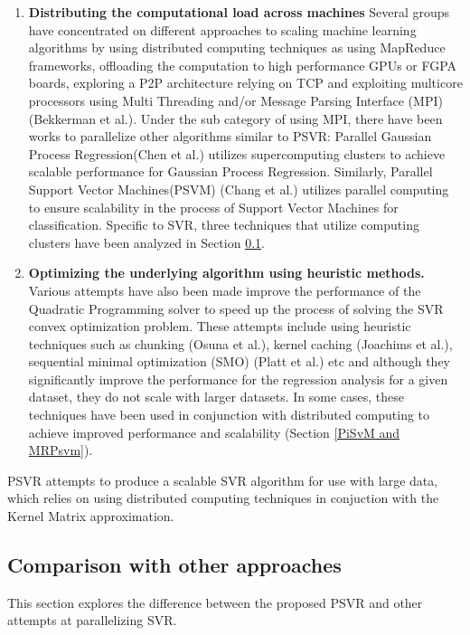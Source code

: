 \documentclass[12pt]{article}
\begin{document}
\begin{enumerate}[label=(\alph*)]
\item {\bf Distributing the computational load across machines}
\newline
Several groups have concentrated on different approaches to scaling machine learning algorithms by using distributed computing techniques as using MapReduce frameworks, offloading the computation to high performance GPUs or FGPA boards, exploring a P2P architecture relying on TCP and exploiting multicore processors using Multi Threading and/or Message Parsing Interface (MPI)(Bekkerman et al.).
\newline \newline
Under the sub category of using MPI, there have been works to parallelize other algorithms similar to PSVR: Parallel Gaussian Process Regression(Chen et al.) utilizes supercomputing clusters to achieve scalable performance for Gaussian Process Regression. Similarly, Parallel Support Vector Machines(PSVM) (Chang et al.)  utilizes parallel computing to ensure scalability in the process of Support Vector Machines for classification. 
Specific to SVR, three techniques that utilize computing clusters have been analyzed in Section \ref{Comparison with other approaches}.
\item {\bf Optimizing the underlying algorithm using heuristic methods.}
\newline
Various attempts have also been made improve the performance of the Quadratic Programming solver to speed up the process of solving the SVR convex optimization problem. These attempts include using heuristic techniques such as chunking (Osuna et al.), kernel caching (Joachims et al.), sequential minimal optimization (SMO) (Platt et al.) etc and although they significantly improve the performance for the regression analysis for a given dataset, they do not scale with larger datasets. In some cases, these techniques have been used in conjunction with distributed computing to achieve improved performance and scalability (Section \ref{PiSvM and MRPsvm}).
\end{enumerate}
PSVR attempts to produce a scalable SVR algorithm for use with large data, which relies on using distributed computing techniques in conjuction with the Kernel Matrix approximation.
\subsection{Comparison with other approaches}
\label{Comparison with other approaches}
This section explores the difference between the proposed PSVR and other attempts at parallelizing SVR.
\end{document}
